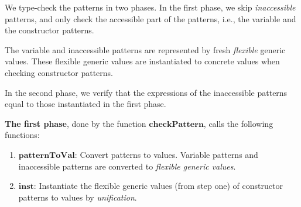 We type-check the patterns in two phases. In the first phase, we skip \emph{inaccessible} patterns, and only check the accessible part of the patterns, i.e., the variable and the constructor patterns.

The variable and inaccessible patterns are represented by fresh \emph{flexible} generic values. These flexible generic values are instantiated to concrete values when checking constructor patterns.

In the second phase, we verify that the expressions of the inaccessible patterns equal to those instantiated in the first phase.

\textbf{The first phase}, done by the function $\boldsymbol{checkPattern}$, calls the following functions:

\begin{enumerate}
  \item $\boldsymbol{patternToVal}$: Convert patterns to values. Variable patterns and inaccessible patterns are converted to \emph{flexible generic values}.
  \item $\boldsymbol{inst}$: Instantiate the flexible generic values (from step one) of constructor patterns to values by \emph{unification}.
\end{enumerate}

